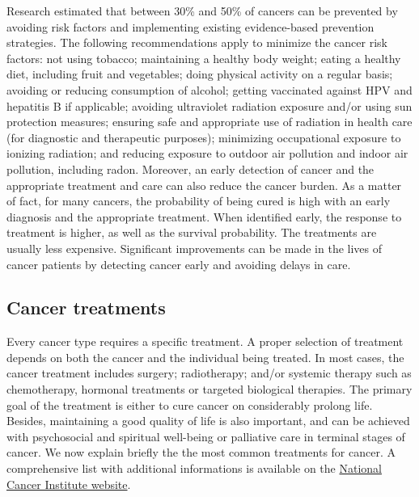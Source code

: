 Research estimated that between 30\% and 50\% of cancers can be prevented by
avoiding risk factors and implementing existing evidence-based prevention
strategies. The following recommendations apply to minimize the cancer risk
factors: not using tobacco; maintaining a healthy body weight; eating a healthy
diet, including fruit and vegetables; doing physical activity on a regular
basis; avoiding or reducing consumption of alcohol; getting vaccinated against
HPV and hepatitis B if applicable; avoiding ultraviolet radiation exposure
and/or using sun protection measures; ensuring safe and appropriate use of
radiation in health care (for diagnostic and therapeutic purposes); minimizing
occupational exposure to ionizing radiation; and reducing exposure to outdoor
air pollution and indoor air pollution, including radon. Moreover, an early
detection of cancer and the appropriate treatment and care can also reduce the
cancer burden. As a matter of fact, for many cancers, the probability of being
cured is high with an early diagnosis and the appropriate treatment. When
identified early, the response to treatment is higher, as well as the survival
probability. The treatments are usually less expensive. Significant improvements
can be made in the lives of cancer patients by detecting cancer early and
avoiding delays in care.

\subsection{Cancer treatments}

Every cancer type requires a specific treatment. A proper selection of treatment
depends on both the cancer and the individual being treated. In most cases, the
cancer treatment includes surgery; radiotherapy; and/or systemic therapy such as
chemotherapy, hormonal treatments or targeted biological therapies. The primary
goal of the treatment is either to cure cancer on considerably prolong life.
Besides, maintaining a good quality of life is also important, and can be
achieved with psychosocial and spiritual well-being or palliative care in
terminal stages of cancer. We now explain briefly the the most common treatments
for cancer. A comprehensive list with additional informations is available on
the \href{https://www.cancer.gov/about-cancer/treatment/types}{National
    Cancer Institute website}.

